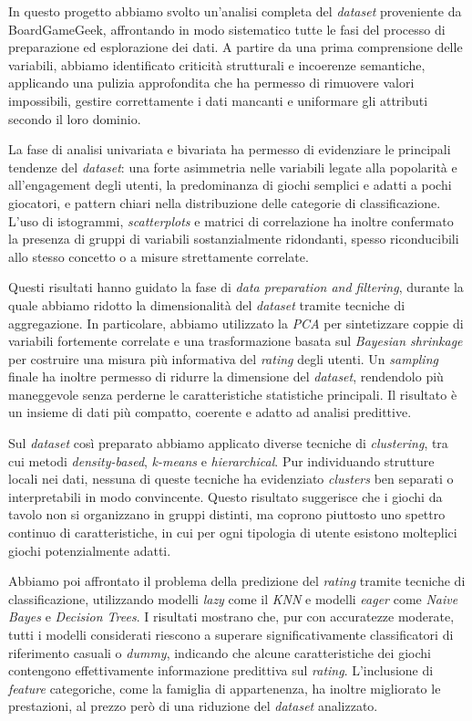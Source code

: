 \documentclass[10pt,twocolumn]{article}
\begin{document}
In questo progetto abbiamo svolto un’analisi completa del \textit{dataset} proveniente da BoardGameGeek, affrontando in modo sistematico tutte le fasi del processo di preparazione ed esplorazione dei dati. A partire da una prima comprensione delle variabili, abbiamo identificato criticità strutturali e incoerenze semantiche, applicando una pulizia approfondita che ha permesso di rimuovere valori impossibili, gestire correttamente i dati mancanti e uniformare gli attributi secondo il loro dominio.

La fase di analisi univariata e bivariata ha permesso di evidenziare le principali tendenze del \textit{dataset}: una forte asimmetria nelle variabili legate alla popolarità e all’engagement degli utenti, la predominanza di giochi semplici e adatti a pochi giocatori, e pattern chiari nella distribuzione delle categorie di classificazione. L’uso di istogrammi, \textit{scatterplots} e matrici di correlazione ha inoltre confermato la presenza di gruppi di variabili sostanzialmente ridondanti, spesso riconducibili allo stesso concetto o a misure strettamente correlate.

Questi risultati hanno guidato la fase di \textit{data preparation and filtering}, durante la quale abbiamo ridotto la dimensionalità del \textit{dataset} tramite tecniche di aggregazione. In particolare, abbiamo utilizzato la \textit{PCA} per sintetizzare coppie di variabili fortemente correlate e una trasformazione basata sul \textit{Bayesian shrinkage} per costruire una misura più informativa del \textit{rating} degli utenti. Un \textit{sampling} finale ha inoltre permesso di ridurre la dimensione del \textit{dataset}, rendendolo più maneggevole senza perderne le caratteristiche statistiche principali. Il risultato è un insieme di dati più compatto, coerente e adatto ad analisi predittive.

Sul \textit{dataset} così preparato abbiamo applicato diverse tecniche di \textit{clustering}, tra cui metodi \textit{density-based}, \textit{k-means} e \textit{hierarchical}. Pur individuando strutture locali nei dati, nessuna di queste tecniche ha evidenziato \textit{clusters} ben separati o interpretabili in modo convincente. Questo risultato suggerisce che i giochi da tavolo non si organizzano in gruppi distinti, ma coprono piuttosto uno spettro continuo di caratteristiche, in cui per ogni tipologia di utente esistono molteplici giochi potenzialmente adatti.

Abbiamo poi affrontato il problema della predizione del \textit{rating} tramite tecniche di classificazione, utilizzando modelli \textit{lazy} come il \textit{KNN} e modelli \textit{eager} come \textit{Naive Bayes} e \textit{Decision Trees}. I risultati mostrano che, pur con accuratezze moderate, tutti i modelli considerati riescono a superare significativamente classificatori di riferimento casuali o \textit{dummy}, indicando che alcune caratteristiche dei giochi contengono effettivamente informazione predittiva sul \textit{rating}. L’inclusione di \textit{feature} categoriche, come la famiglia di appartenenza, ha inoltre migliorato le prestazioni, al prezzo però di una riduzione del \textit{dataset} analizzato.
\end{document}
